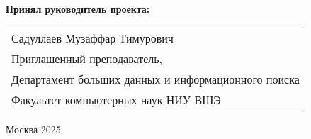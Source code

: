 \begin{titlepage}
    \vspace{1em}
    {\bf Принял руководитель проекта: \vspace{2mm}}
    
    {
    \begin{tabular}{l}
    Садуллаев Музаффар Тимурович\\
    Приглашенный преподаватель, \\
    Департамент больших данных и информационного поиска\\
    Факультет компьютерных наук НИУ ВШЭ 
    \end{tabular}}
    
    
    \vspace{\fill}
    
    \begin{center}
    Москва 2025
    \end{center}
    
    \end{titlepage}